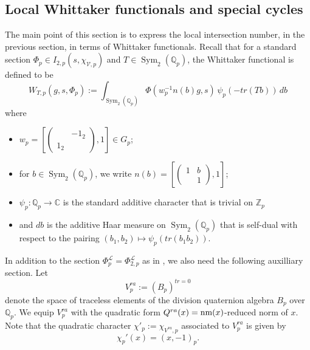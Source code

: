 \documentclass[reqno,oneside]{amsart}
\theoremstyle{plain}
\theoremstyle{remark}
\numberwithin{theorem}{section}
\newcommand{\bbC}{\mathbb C}
\newcommand{\bbQ}{\mathbb Q}
\newcommand{\bbZ}{\mathbb Z}
\newcommand{\calL}{\mathcal L}
\newcommand{\calV}{\mathcal V}
\newcommand{\psm}[1]{\left( \begin{smallmatrix}#1 \end{smallmatrix} \right)}
\DeclareMathOperator{\Sym}{Sym}
\begin{document}
	\subsection{Local Whittaker functionals and special cycles}
	
	The main point of this section is to express  the local intersection number, in the previous section, in terms of Whittaker functionals. Recall that for a standard section $\Phi_p \in I_{2,p}(s, \chi_{\calV,p})$ and $T \in \Sym_2(\bbQ_p)$, the Whittaker functional is defined to be
	\begin{equation}
	W_{T,p}(g, s, \Phi_p) := \int_{\Sym_2(\bbQ_p)}  \Phi( w_p^{-1}  n(b)g , s) \, \psi_p(- tr (Tb))  \, db
	\end{equation}
	where
	\begin{itemize}
		\item $w_p = \left[ \psm{& -1_2 \\ 1_2 & } , 1\right] \in G_p$;
		\item for $b \in \Sym_2(\bbQ_p)$, we write $n(b) = \left[ \psm{1 & b \\ & 1 }, 1 \right]$;
		\item $\psi_p \colon \bbQ_p \to \bbC$ is the standard additive character that is trivial on $\bbZ_p$
		\item and $db$ is the additive Haar measure on $\Sym_2(\bbQ_p)$ that is self-dual with respect to the pairing $(b_1 , b_2) \mapsto \psi_p(tr(b_1 b_2))$.
	\end{itemize}
	
	In addition to the section $\Phi_{p}^{\calL} = \Phi_{2,p}^{\calL}$ as in , we also need the following auxilliary section. Let
	\begin{equation}
	V^{ra}_{p} := (B_{p} )^{tr = 0}
	\end{equation}
	denote the space of traceless elements of the division quaternion algebra $B_{p}$ over $\bbQ_{p}$. We equip $V^{ra}_{p}$ with the quadratic form $Q^{ra}(x) = \hbox{nm}(x)$-reduced norm of $x$.  Note that the quadratic character $\chi'_p := \chi_{V^{ra}, p}$ associated to $V^{ra}_{p}$ is given by
	\begin{equation}
	\chi_{p}'(x) = (x, -1)_{p}.
	\end{equation}
	
\end{document}
